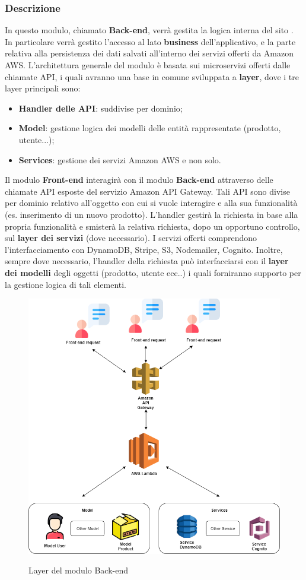\subsubsection{Descrizione}
In questo modulo, chiamato \textbf{Back-end}, verrà gestita la logica interna del sito \nameproject. In particolare verrà gestito l'accesso al lato \textbf{business} dell'applicativo, e la parte relativa alla persistenza dei dati salvati all'interno dei servizi offerti da Amazon AWS. L'architettura generale del modulo è basata sui microservizi offerti dalle chiamate API, i quali avranno una base in comune sviluppata a \textbf{layer}, dove i tre layer principali sono:
\begin{itemize}
	\item \textbf{Handler delle API}: suddivise per dominio;
	\item \textbf{Model}: gestione logica dei modelli delle entità rappresentate (prodotto, utente...);
	\item \textbf{Services}: gestione dei servizi Amazon AWS e non solo.
\end{itemize} Il modulo \textbf{Front-end} interagirà con il modulo \textbf{Back-end} attraverso delle chiamate API esposte del servizio Amazon API Gateway. Tali API sono divise per dominio relativo all'oggetto con cui si vuole interagire e alla sua funzionalità (es. inserimento di un nuovo prodotto). L'handler gestirà la richiesta in base alla propria funzionalità e smisterà la relativa richiesta, dopo un opportuno controllo, sul \textbf{layer dei servizi} (dove necessario). I servizi offerti comprendono l'interfacciamento con DynamoDB, Stripe, S3, Nodemailer, Cognito. Inoltre, sempre dove necessario, l'handler della richiesta può interfacciarsi con il \textbf{layer dei modelli} degli oggetti (prodotto, utente ecc..) i quali forniranno supporto per la gestione logica di tali elementi.

\vspace{1cm}

\begin{figure}[H]
\centering
\includegraphics[scale=0.40]{res/Architettura/Backend/img/layerBack-end.png}\\
\caption{Layer del modulo Back-end}
\end{figure}